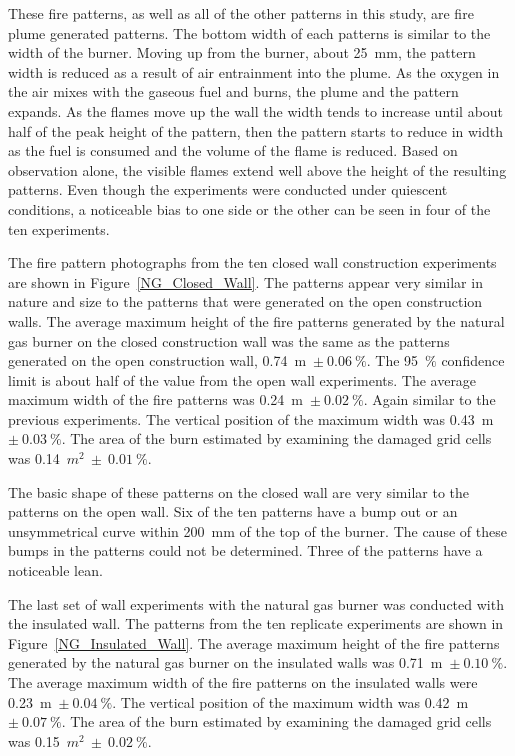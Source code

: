 \documentclass[twoside]{uocthesis}
\begin{document}
{These fire patterns, as well as all of the other patterns in this study, are fire plume generated patterns. The bottom width of each patterns is similar to the width of the burner. Moving up from the burner, about 25~mm, the pattern width is reduced as a result of air entrainment into the plume.  As the oxygen in the air mixes with the gaseous fuel and burns, the plume and the pattern expands.  As the flames move up the wall the width tends to increase until about half of the peak height of the pattern, then the pattern starts to reduce in width as the fuel is consumed and the volume of the flame is reduced.  Based on observation alone, the visible flames extend well above the height of the resulting patterns.  Even though the experiments were conducted under quiescent conditions, a noticeable bias to one side or the other can be seen in four of the ten experiments.           

The fire pattern photographs from the ten closed wall construction experiments are shown in Figure~\ref{NG_Closed_Wall}. 
The patterns appear very similar in nature and size to the patterns that were generated on the open construction walls.  The average maximum height of the fire patterns generated by the natural gas burner on the closed construction wall was the same as the patterns generated on the open construction wall, 0.74~m~$\pm~0.06~\%$.  The 95~$\%$ confidence limit is about half of the value from the open wall experiments. The average maximum width of the fire patterns was 0.24~m~$\pm~0.02~\%$.  Again similar to the previous experiments. The vertical position of the maximum width was 0.43~m~$\pm~0.03~\%$. The area of the burn estimated by examining the damaged grid cells was 0.14~$m^2~\pm~0.01~\%$.  

The basic shape of these patterns on the closed wall are very similar to the patterns on the open wall.  Six of the ten patterns have a bump out or an unsymmetrical curve within 200~mm of the top of the burner.  The cause of these bumps in the patterns could not be determined. Three of the patterns have a noticeable lean.     
  
The last set of wall experiments with the natural gas burner was conducted with the insulated wall.  The patterns from the ten replicate experiments are shown in Figure~\ref{NG_Insulated_Wall}.  The average maximum height of the fire patterns generated by the natural gas burner on the insulated walls was 0.71~m~$\pm~0.10~\%$.  The average maximum width of the fire patterns on the insulated walls were 0.23~m~$\pm~0.04~\%$.  The vertical position of the maximum width was 0.42~m~$\pm~0.07~\%$. The area of the burn estimated by examining the damaged grid cells was 0.15~$m^2~\pm~0.02~\%$.  

}
\end{document}
